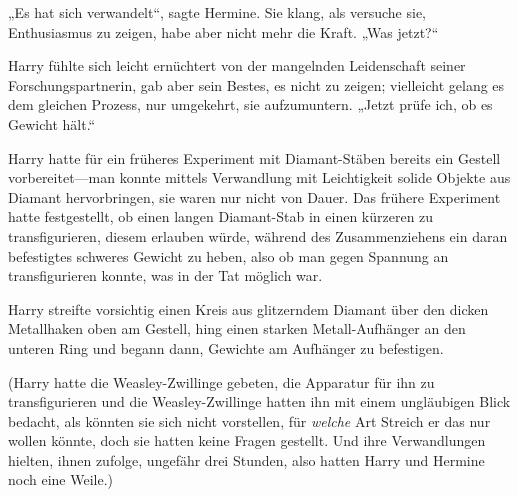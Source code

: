„Es hat sich verwandelt“, sagte Hermine. Sie klang, als versuche sie, Enthusiasmus zu zeigen, habe aber nicht mehr die Kraft. „Was jetzt?“

Harry fühlte sich leicht ernüchtert von der mangelnden Leidenschaft seiner Forschungspartnerin, gab aber sein Bestes, es nicht zu zeigen; vielleicht gelang es dem gleichen Prozess, nur umgekehrt, sie aufzumuntern. „Jetzt prüfe ich, ob es Gewicht hält.“

Harry hatte für ein früheres Experiment mit Diamant-Stäben bereits ein Gestell vorbereitet—man konnte mittels Verwandlung mit Leichtigkeit solide Objekte aus Diamant hervorbringen, sie waren nur nicht von Dauer. Das frühere Experiment hatte festgestellt, ob einen langen Diamant-Stab in einen kürzeren zu transfigurieren, diesem erlauben würde, während des Zusammenziehens ein daran befestigtes schweres Gewicht zu heben, also ob man gegen Spannung an transfigurieren konnte, was in der Tat möglich war.

Harry streifte vorsichtig einen Kreis aus glitzerndem Diamant über den dicken Metallhaken oben am Gestell, hing einen starken Metall-Aufhänger an den unteren Ring und begann dann, Gewichte am Aufhänger zu befestigen.

(Harry hatte die Weasley-Zwillinge gebeten, die Apparatur für ihn zu transfigurieren und die Weasley-Zwillinge hatten ihn mit einem ungläubigen Blick bedacht, als könnten sie sich nicht vorstellen, für \emph{welche} Art Streich er das nur wollen könnte, doch sie hatten keine Fragen gestellt. Und ihre Verwandlungen hielten, ihnen zufolge, ungefähr drei Stunden, also hatten Harry und Hermine noch eine Weile.)

